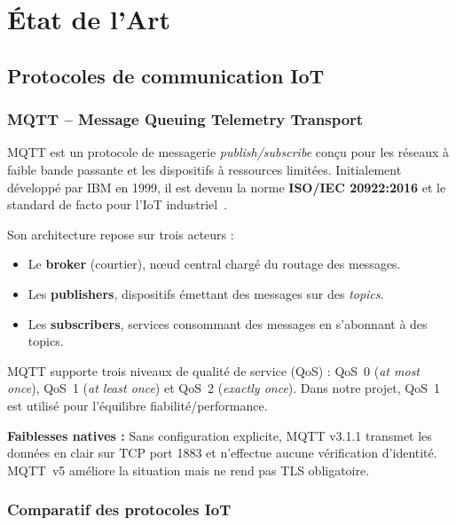 \chapter{État de l'Art}

\section{Protocoles de communication IoT}

\subsection{MQTT -- Message Queuing Telemetry Transport}

MQTT est un protocole de messagerie \textit{publish/subscribe} conçu pour les réseaux à faible bande passante et les dispositifs à ressources limitées. Initialement développé par IBM en 1999, il est devenu la norme \textbf{ISO/IEC 20922:2016} et le standard de facto pour l'IoT industriel~\cite{mqtt5}.

Son architecture repose sur trois acteurs :
\begin{itemize}
  \item Le \textbf{broker} (courtier), nœud central chargé du routage des messages.
  \item Les \textbf{publishers}, dispositifs émettant des messages sur des \textit{topics}.
  \item Les \textbf{subscribers}, services consommant des messages en s'abonnant à des topics.
\end{itemize}

MQTT supporte trois niveaux de qualité de service (\ac{QoS}) : QoS~0 (\textit{at most once}), QoS~1 (\textit{at least once}) et QoS~2 (\textit{exactly once}). Dans notre projet, QoS~1 est utilisé pour l'équilibre fiabilité/performance.

\textbf{Faiblesses natives :} Sans configuration explicite, MQTT v3.1.1 transmet les données en clair sur TCP port 1883 et n'effectue aucune vérification d'identité. MQTT~v5 améliore la situation mais ne rend pas TLS obligatoire.

\subsection{Comparatif des protocoles IoT}

